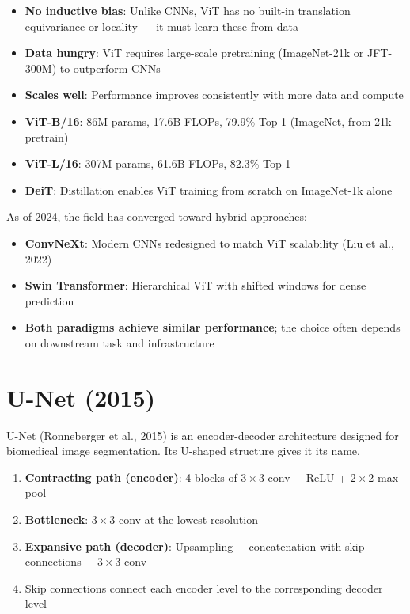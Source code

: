 \begin{properties}
\begin{itemize}
    \item \textbf{No inductive bias}: Unlike CNNs, ViT has no built-in translation equivariance or locality --- it must learn these from data
    \item \textbf{Data hungry}: ViT requires large-scale pretraining (ImageNet-21k or JFT-300M) to outperform CNNs
    \item \textbf{Scales well}: Performance improves consistently with more data and compute
    \item \textbf{ViT-B/16}: 86M params, 17.6B FLOPs, 79.9\% Top-1 (ImageNet, from 21k pretrain)
    \item \textbf{ViT-L/16}: 307M params, 61.6B FLOPs, 82.3\% Top-1
    \item \textbf{DeiT}: Distillation enables ViT training from scratch on ImageNet-1k alone
\end{itemize}
\end{properties}

\begin{note}
As of 2024, the field has converged toward hybrid approaches:
\begin{itemize}
    \item \textbf{ConvNeXt}: Modern CNNs redesigned to match ViT scalability (Liu et al., 2022)
    \item \textbf{Swin Transformer}: Hierarchical ViT with shifted windows for dense prediction
    \item \textbf{Both paradigms achieve similar performance}; the choice often depends on downstream task and infrastructure
\end{itemize}
\end{note}

\section{U-Net (2015)}

U-Net (Ronneberger et al., 2015) is an encoder-decoder architecture designed for biomedical image segmentation. Its U-shaped structure gives it its name.

\begin{architecture}
\begin{enumerate}
    \item \textbf{Contracting path (encoder)}: 4 blocks of $3\times3$ conv + ReLU + $2\times2$ max pool
    \item \textbf{Bottleneck}: $3\times3$ conv at the lowest resolution
    \item \textbf{Expansive path (decoder)}: Upsampling + concatenation with skip connections + $3\times3$ conv
    \item Skip connections connect each encoder level to the corresponding decoder level
\end{enumerate}
\end{architecture}

